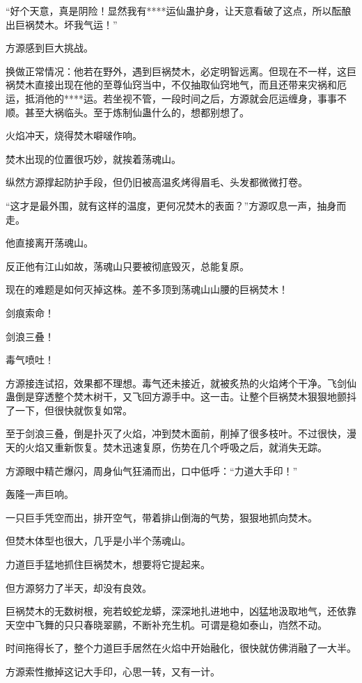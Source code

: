 \begin{this_body}
“好个天意，真是阴险！显然我有****运仙蛊护身，让天意看破了这点，所以酝酿出巨祸焚木。坏我气运！”

方源感到巨大挑战。

换做正常情况：他若在野外，遇到巨祸焚木，必定明智远离。但现在不一样，这巨祸焚木直接出现在他的至尊仙窍当中，不仅抽取仙窍地气，而且还带来灾祸和厄运，抵消他的****运。若坐视不管，一段时间之后，方源就会厄运缠身，事事不顺。甚至大祸临头。至于炼制仙蛊什么的，想都别想了。

火焰冲天，烧得焚木噼啵作响。

焚木出现的位置很巧妙，就挨着荡魂山。

纵然方源撑起防护手段，但仍旧被高温炙烤得眉毛、头发都微微打卷。

“这才是最外围，就有这样的温度，更何况焚木的表面？”方源叹息一声，抽身而走。

他直接离开荡魂山。

反正他有江山如故，荡魂山只要被彻底毁灭，总能复原。

现在的难题是如何灭掉这株。差不多顶到荡魂山山腰的巨祸焚木！

剑痕索命！

剑浪三叠！

毒气喷吐！

方源接连试招，效果都不理想。毒气还未接近，就被炙热的火焰烤个干净。飞剑仙蛊倒是穿透整个焚木树干，又飞回方源手中。这一击。让整个巨祸焚木狠狠地颤抖了一下，但很快就恢复如常。

至于剑浪三叠，倒是扑灭了火焰，冲到焚木面前，削掉了很多枝叶。不过很快，漫天的火焰又重新恢复。焚木迅速复原，伤势在几个呼吸之后，就消失无踪。

方源眼中精芒爆闪，周身仙气狂涌而出，口中低呼：“力道大手印！”

轰隆一声巨响。

一只巨手凭空而出，排开空气，带着排山倒海的气势，狠狠地抓向焚木。

但焚木体型也很大，几乎是小半个荡魂山。

力道巨手猛地抓住巨祸焚木，想要将它提起来。

但方源努力了半天，却没有良效。

巨祸焚木的无数树根，宛若蛟蛇龙蟒，深深地扎进地中，凶猛地汲取地气，还依靠天空中飞舞的只只春晓翠鹂，不断补充生机。可谓是稳如泰山，岿然不动。

时间拖得长了，整个力道巨手居然在火焰中开始融化，很快就仿佛消融了一大半。

方源索性撤掉这记大手印，心思一转，又有一计。


\end{this_body}
